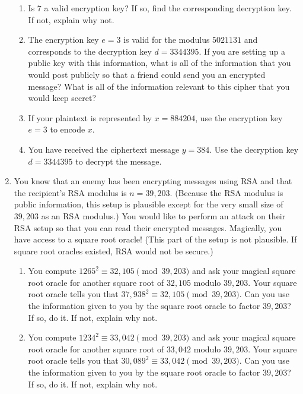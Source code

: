 \documentclass[10pt,a4paper]{article}
\begin{document}
\begin{enumerate}
\begin{enumerate}
\item Is $7$ a valid encryption key?  If so, find the corresponding decryption key.  If not, explain why not.
\item The encryption key $e = 3$ is valid for the modulus $5021131$ and corresponds to the decryption key $d = 3344395$.  If you are setting up a public key with this information, what is all of the information that you would post publicly so that a friend could send you an encrypted message?  What is all of the information relevant to this cipher that you would keep secret?
\item If your plaintext is represented by $x = 884204$, use the encryption key $e = 3$ to encode $x$.
\item You have received the ciphertext message $y = 384$.  Use the decryption key $d = 3344395$ to decrypt the message.  
\end{enumerate}
\item You know that an enemy has been encrypting messages using RSA and that the recipient's RSA modulus is $n = 39,203$.  (Because the RSA modulus is public information, this setup is plausible except for the very small size of $39,203$ as an RSA modulus.)  You would like to perform an attack on their RSA setup so that you can read their encrypted messages.  Magically, you have access to a square root oracle!  (This part of the setup is not plausible.  If square root oracles existed, RSA would not be secure.)  
\begin{enumerate}
\item You compute $1265^2 \equiv 32,105 \pmod{39,203}$ and ask your magical square root oracle for another square root of $32,105$ modulo $39,203$.  Your square root oracle tells you that $37,938^2 \equiv 32,105 \pmod{39,203}$.  Can you use the information given to you by the square root oracle to factor $39,203$?  If so, do it.  If not, explain why not.

\item You compute $1234^2\equiv 33,042 \pmod{39,203}$ and ask your magical square root oracle for another square root of $33,042$ modulo $39,203$. Your square root oracle tells you that $30,089^2\equiv 33,042\pmod{39,203}$.  Can you use the information given to you by the square root oracle to factor $39,203$?  If so, do it.  If not, explain why not.
\end{enumerate}

\end{enumerate}
\end{document}
